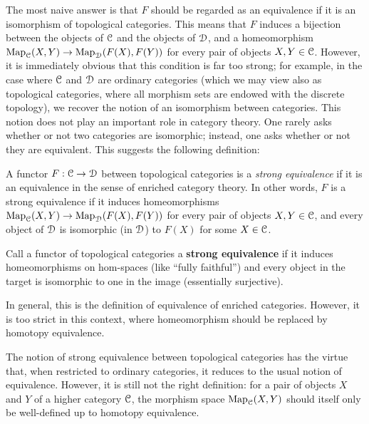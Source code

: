 The most naive answer is that $F$ should be regarded as an equivalence if it is an isomorphism of topological categories. This means that $F$ induces a bijection between the objects of $\operatorname{\mathcal{C}}$ and the objects of $\operatorname{\mathcal{D}}$, and a homeomorphism $\operatorname{{Map}}_{\operatorname{\mathcal{C}}}(X,Y) \rightarrow \operatorname{{Map}}_{\operatorname{\mathcal{D}}}(F(X),F(Y))$ for every pair of objects $X,Y \in \operatorname{\mathcal{C}}$. However, it is immediately obvious that this condition is far too strong; for example, in the case where $\operatorname{\mathcal{C}}$ and $\operatorname{\mathcal{D}}$ are ordinary categories (which we may view also as topological categories, where all morphism sets are endowed with the discrete topology), we recover the notion of an isomorphism between categories. This notion does not play an important role in category theory. One rarely asks whether or not two categories are isomorphic; instead, one asks whether or not they are equivalent. This suggests the following definition:

\begin{definition}
A functor $F: \operatorname{\mathcal{C}} \rightarrow \operatorname{\mathcal{D}}$ between topological categories is a  {\it strong equivalence} if it is an equivalence in the sense of enriched category theory. In other words, $F$ is a strong equivalence if it induces homeomorphisms $\operatorname{{Map}}_{\operatorname{\mathcal{C}}}(X,Y) \rightarrow \operatorname{{Map}}_{\operatorname{\mathcal{D}}}(F(X),F(Y))$ for every pair of objects $X,Y \in \operatorname{\mathcal{C}}$, and every object of $\operatorname{\mathcal{D}}$ is isomorphic (in $\operatorname{\mathcal{D}}$) to $F(X)$ for some $X \in \operatorname{\mathcal{C}}$.
\end{definition}
\begin{shaded}
Call a functor of topological categories a \textbf{strong equivalence} if it induces homeomorphisms on hom-spaces (like ``fully faithful'') and every object in the target is isomorphic to one in the image (essentially surjective).

In general, this is the definition of equivalence of enriched categories.
However, it is too strict in this context, where homeomorphism should be replaced by homotopy equivalence.
\end{shaded}

The notion of strong equivalence between topological categories has the virtue that, when restricted to ordinary categories, it reduces to the usual notion of equivalence. However, it is still not the right definition: for a pair of objects $X$ and $Y$ of a higher category $\operatorname{\mathcal{C}}$, the morphism space $\operatorname{{Map}}_{\operatorname{\mathcal{C}}}(X,Y)$ should itself only be well-defined up to homotopy equivalence. 

